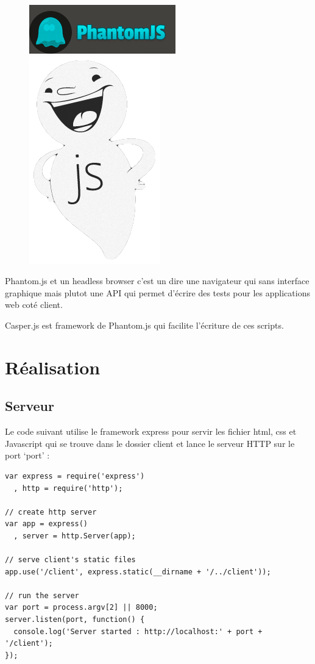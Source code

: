 \documentclass[a4paper]{article}
\begin{document}
\begin{figure}[H]
  \begin{center}
  \includegraphics[scale=0.5]{phantomjs.png}
  \includegraphics[scale=0.2]{casperjs.png}
  \end{center}
\end{figure}

Phantom.js et un headless browser c'est un dire une navigateur qui sans interface
graphique mais plutot une API qui permet d'écrire des tests pour les applications
web coté client.

Casper.js est framework de Phantom.js qui facilite l'écriture de ces scripts.

\section{Réalisation}

\subsection{Serveur}

Le code suivant utilise le framework express pour servir les fichier html, css et Javascript
qui se trouve dans le dossier client
et lance le serveur HTTP sur le port `port' : 

\begin{lstlisting}
var express = require('express')
  , http = require('http');

// create http server
var app = express()
  , server = http.Server(app);

// serve client's static files
app.use('/client', express.static(__dirname + '/../client'));

// run the server
var port = process.argv[2] || 8000;
server.listen(port, function() {
  console.log('Server started : http://localhost:' + port + '/client');
});
\end{lstlisting}
\end{document}
